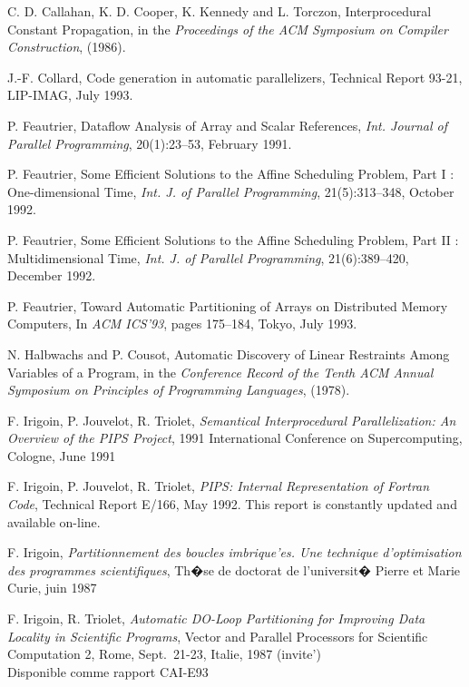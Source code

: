 \documentclass[a4paper]{report}
\begin{document}
\begin{thebibliography}{99}
   C. D. Callahan, K. D. Cooper, K. Kennedy and L. Torczon,
Interprocedural Constant Propagation,
in the {\em Proceedings of the ACM
Symposium on Compiler Construction}, (1986).

 J.-F. Collard, Code generation in automatic
  parallelizers, Technical Report 93-21, LIP-IMAG, July 1993.

   P. Feautrier, {Dataflow Analysis of Array and Scalar
    References}, {\em Int. Journal of Parallel Programming}, 20(1):23--53,
    February 1991.

 P. Feautrier, {Some Efficient Solutions to the Affine
  Scheduling Problem, Part I : One-dimensional Time}, {\em Int. J. of
  Parallel Programming}, 21(5):313--348, October 1992.

 P. Feautrier, {Some Efficient Solutions to the Affine
  Scheduling Problem, Part II : Multidimensional Time}, {\em Int. J. of
  Parallel Programming}, 21(6):389--420, December 1992.

 P. Feautrier, {Toward Automatic Partitioning of Arrays on
  Distributed Memory Computers}, In {\em ACM ICS'93}, pages 175--184,
  Tokyo, July 1993.

   N. Halbwachs and P. Cousot, Automatic Discovery of Linear
Restraints Among Variables of a Program, in the {\em Conference Record
of the Tenth ACM Annual Symposium on Principles of Programming
Languages}, (1978).

   F. Irigoin, P. Jouvelot, R. Triolet,  {\em Semantical
Interprocedural Parallelization: An Overview of the PIPS Project},
1991 International Conference on Supercomputing, Cologne, June 1991

   F. Irigoin, P. Jouvelot, R. Triolet, {\em PIPS:
Internal Representation of Fortran Code}, Technical Report E/166, May
1992. This report is constantly updated and available on-line.

   F. Irigoin,
{\em Partitionnement des boucles imbrique'es. Une tech\-nique
d'opti\-mi\-sation des programmes scientifiques},
Th�se de doctorat de l'universit� Pierre et Marie Curie, juin 1987

   F. Irigoin, R. Triolet,
{\em Automatic DO-Loop Partitioning for Improving
Data Locality in Scientific Programs}, Vector and Parallel Processors
for Scientific Computation 2, Rome, Sept.~21-23, Italie, 1987 (invite') \\
Disponible comme rapport CAI-E93


\end{thebibliography}
\end{document}
